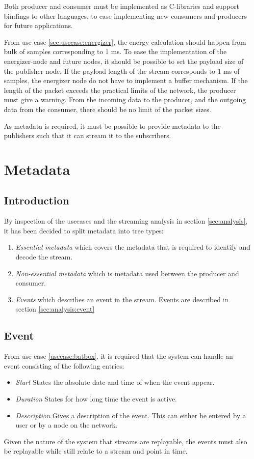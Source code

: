 Both producer and consumer must be implemented as C-libraries and support bindings to other languages, to ease implementing new consumers and producers for future applications.

From use case \ref{sec:usecase:energizer}, the energy calculation should happen from bulk of samples corresponding to 1 ms. To ease the implementation of the energizer-node and future nodes, it should be possible to set the payload size of the publisher node. If the payload length of the stream corresponds to 1 ms of samples, the energizer node do not have to implement a buffer mechanism. If the length of the packet exceeds the practical limits of the network, the producer must give a warning. From the incoming data to the producer, and the outgoing data from the consumer, there should be no limit of the packet sizes.

As metadata is required, it must be possible to provide metadata to the publishers such that it can stream it to the subscribers. 


\section{Metadata}
\subsection{Introduction}

By inspection of the usecases and the streaming analysis in section \ref{sec:analysis}, it has been decided to split metadata into tree types:
\begin{enumerate}
	\item \textit{Essential metadata} which covers the metadata that is required to identify and decode the stream.
	\item \textit{Non-essential metadata} which is metadata used between the producer and consumer.
	\item \textit{Events} which describes an event in the stream. Events are described in section \ref{sec:analysis:event}
\end{enumerate}

\subsection{Event}
From use case \ref{usecase:batbox}, it is required that the system can handle an event consisting of the following entries:
\begin{itemize}
	\item \textit{Start} States the absolute date and time of when the event appear. 
	\item \textit{Duration} States for how long time the event is active.
	\item \textit{Description} Gives a description of the event. This can either be entered by a user or by a node on the network.
\end{itemize}
Given the nature of the system that streams are replayable, the events must also be replayable while still relate to a stream and point in time.


